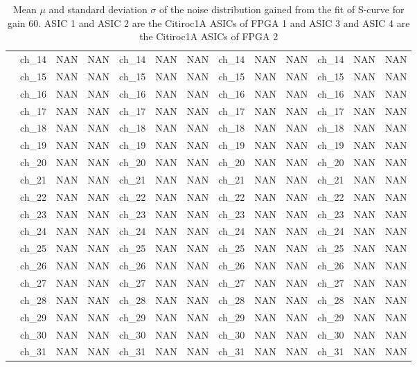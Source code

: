 \begin{table}[H]
{\begin{tabular}{|c|c|c|c|c|c|c|c|c|c|c|c|c|}
        &ch\_14 & NAN & NAN & ch\_14 & NAN & NAN & ch\_14 & NAN & NAN & ch\_14 & NAN & NAN \\
        &ch\_15 & NAN & NAN & ch\_15 & NAN & NAN & ch\_15 & NAN & NAN & ch\_15 & NAN & NAN \\
        &ch\_16 & NAN & NAN & ch\_16 & NAN & NAN & ch\_16 & NAN & NAN & ch\_16 & NAN & NAN \\
        &ch\_17 & NAN & NAN & ch\_17 & NAN & NAN & ch\_17 & NAN & NAN & ch\_17 & NAN & NAN \\
        &ch\_18 & NAN & NAN & ch\_18 & NAN & NAN & ch\_18 & NAN & NAN & ch\_18 & NAN & NAN \\
        &ch\_19 & NAN & NAN & ch\_19 & NAN & NAN & ch\_19 & NAN & NAN & ch\_19 & NAN & NAN \\
        &ch\_20 & NAN & NAN & ch\_20 & NAN & NAN & ch\_20 & NAN & NAN & ch\_20 & NAN & NAN \\
        &ch\_21 & NAN & NAN & ch\_21 & NAN & NAN & ch\_21 & NAN & NAN & ch\_21 & NAN & NAN \\
        &ch\_22 & NAN & NAN & ch\_22 & NAN & NAN & ch\_22 & NAN & NAN & ch\_22 & NAN & NAN \\
        &ch\_23 & NAN & NAN & ch\_23 & NAN & NAN & ch\_23 & NAN & NAN & ch\_23 & NAN & NAN \\
        &ch\_24 & NAN & NAN & ch\_24 & NAN & NAN & ch\_24 & NAN & NAN & ch\_24 & NAN & NAN \\
        &ch\_25 & NAN & NAN & ch\_25 & NAN & NAN & ch\_25 & NAN & NAN & ch\_25 & NAN & NAN \\
        &ch\_26 & NAN & NAN & ch\_26 & NAN & NAN & ch\_26 & NAN & NAN & ch\_26 & NAN & NAN \\
        &ch\_27 & NAN & NAN & ch\_27 & NAN & NAN & ch\_27 & NAN & NAN & ch\_27 & NAN & NAN \\
        &ch\_28 & NAN & NAN & ch\_28 & NAN & NAN & ch\_28 & NAN & NAN & ch\_28 & NAN & NAN \\
        &ch\_29 & NAN & NAN & ch\_29 & NAN & NAN & ch\_29 & NAN & NAN & ch\_29 & NAN & NAN \\
        &ch\_30 & NAN & NAN & ch\_30 & NAN & NAN & ch\_30 & NAN & NAN & ch\_30 & NAN & NAN \\
        &ch\_31 & NAN & NAN & ch\_31 & NAN & NAN & ch\_31 & NAN & NAN & ch\_31 & NAN & NAN \\
        \hline
     
    \end{tabular}
    }
    \caption{Mean $\mu$ and standard deviation $\sigma$ of the noise distribution gained from the fit of S-curve for gain 60. ASIC 1 and ASIC 2 are the Citiroc1A ASICs of FPGA 1 and ASIC 3 and ASIC 4 are the Citiroc1A ASICs of FPGA 2}
    \label{tab:noise_parameter_1}
\end{table}


